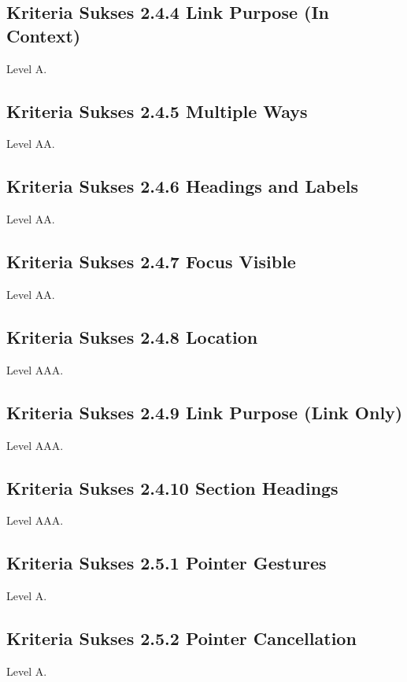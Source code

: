 \subsection{Kriteria Sukses 2.4.4 Link Purpose (In Context)}
\label{sec:kriteria_2.4.4}
Level A.

\subsection{Kriteria Sukses 2.4.5 Multiple Ways}
\label{sec:kriteria_2.4.5}
Level AA.

\subsection{Kriteria Sukses 2.4.6 Headings and Labels}
\label{sec:kriteria_2.4.6}
Level AA.

\subsection{Kriteria Sukses 2.4.7 Focus Visible}
\label{sec:kriteria_2.4.7}
Level AA.

\subsection{Kriteria Sukses 2.4.8 Location}
\label{sec:kriteria_2.4.8}
Level AAA.

\subsection{Kriteria Sukses 2.4.9 Link Purpose (Link Only)}
\label{sec:kriteria_2.4.9}
Level AAA.

\subsection{Kriteria Sukses 2.4.10 Section Headings}
\label{sec:kriteria_2.4.10}
Level AAA.

\subsection{Kriteria Sukses 2.5.1 Pointer Gestures}
\label{sec:kriteria_2.5.1}
Level A.

\subsection{Kriteria Sukses 2.5.2 Pointer Cancellation}
\label{sec:kriteria_2.5.2}
Level A.

